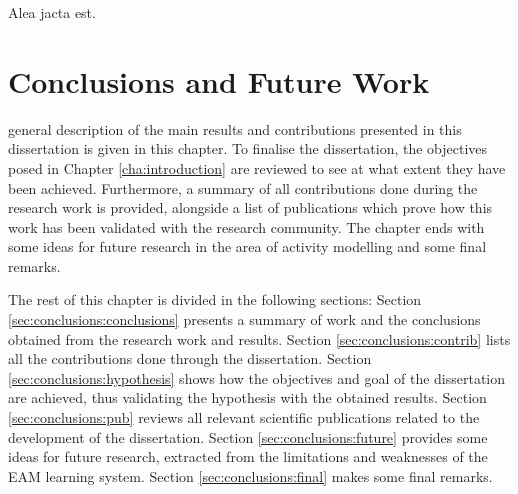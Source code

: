 

\begin{savequote}[50mm]
Alea jacta est.
\end{savequote}


\chapter{Conclusions and Future Work}
\label{cha:conclusions}

\ifpdf
    \graphicspath{{7_conclusions/figures/PDF/}{7_conclusions/figures/PNG/}{7_conclusions/figures/}}
\else
    \graphicspath{{7_conclusions/figures/EPS/}{7_conclusions/figures/}}
\fi

 general description of the main results and contributions presented in this dissertation is given in this chapter. To finalise the dissertation, the objectives posed in Chapter \ref{cha:introduction} are reviewed to see at what extent they have been achieved. Furthermore, a summary of all contributions done during the research work is provided, alongside a list of publications which prove how this work has been validated with the research community. The chapter ends with some ideas for future research in the area of activity modelling and some final remarks.

The rest of this chapter is divided in the following sections: Section \ref{sec:conclusions:conclusions} presents a summary of work and the conclusions obtained from the research work and results. Section \ref{sec:conclusions:contrib} lists all the contributions done through the dissertation. Section \ref{sec:conclusions:hypothesis} shows how the objectives and goal of the dissertation are achieved, thus validating the hypothesis with the obtained results. Section \ref{sec:conclusions:pub} reviews all relevant scientific publications related to the development of the dissertation. Section \ref{sec:conclusions:future} provides some ideas for future research, extracted from the limitations and weaknesses of the EAM learning system. Section \ref{sec:conclusions:final} makes some final remarks.